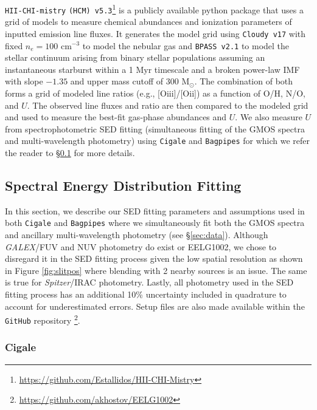 \documentclass[twocolumn,tight,times,linenumbers]{aastex631}
\newcommand{\oii}{[O{\sc ii}]}
\newcommand{\oiii}{[O{\sc iii}]}
\newcommand{\msol}{M$_\odot$}
\begin{document}
		\texttt{HII-CHI-mistry} \texttt{(HCM) v5.3}\footnote{\href{https://github.com/Estallidos/HII-CHI-Mistry}{https://github.com/Estallidos/HII-CHI-Mistry}} \citep{PerezMontero2014} is a publicly available python package that uses a grid of models to measure chemical abundances and ionization parameters of inputted emission line fluxes. It generates the model grid using \texttt{Cloudy v17} \citep{Ferland2017} with fixed $n_e = 100$ cm$^{-3}$ to model the nebular gas and \texttt{BPASS v2.1} \citep{Eldridge2017} to model the stellar continuum arising from binary stellar populations assuming an instantaneous starburst within a 1 Myr timescale and a broken power-law IMF with slope $-1.35$ and upper mass cutoff of $300$ \msol. The combination of both forms a grid of modeled line ratios (e.g., \oiii/\oii) as a function of O/H, N/O, and $U$. The observed line fluxes and ratio are then compared to the modeled grid and used to measure the best-fit gas-phase abundances and $U$. We also measure $U$ from spectrophotometric SED fitting (simultaneous fitting of the GMOS spectra and multi-wavelength photometry) using \texttt{Cigale} and \texttt{Bagpipes} for which we refer the reader to \S\ref{sec:SED} for more details.
	
		\subsection{Spectral Energy Distribution Fitting}
		\label{sec:SED}
		
		In this section, we describe our SED fitting parameters and assumptions used in both \texttt{Cigale} and \texttt{Bagpipes} where we simultaneously fit both the GMOS spectra and ancillary multi-wavelength photometry (see \S\ref{sec:data}). Although \textit{GALEX}/FUV and NUV photometry do exist or EELG1002, we chose to disregard it in the SED fitting process given the low spatial resolution as shown in Figure \ref{fig:slitpos} where blending with 2 nearby sources is an issue. The same is true for \textit{Spitzer}/IRAC photometry. Lastly, all photometry used in the SED fitting process has an additional 10\% uncertainty included in quadrature to account for underestimated errors. Setup files are also made available within the \texttt{GitHub} repository \footnote{\href{https://github.com/akhostov/EELG1002}{https://github.com/akhostov/EELG1002}}. 
		
		
		\subsubsection{{\sc Cigale}}
		\label{sec:cigale}
				
\end{document}
